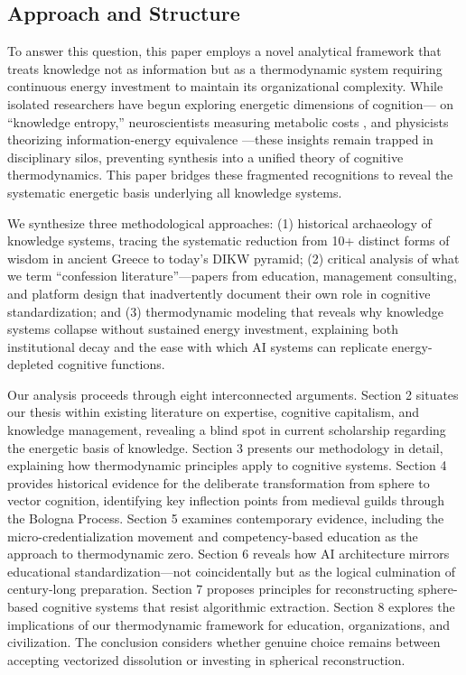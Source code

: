 \subsection{Approach and Structure}

To answer this question, this paper employs a novel analytical framework that treats knowledge not as information but as a thermodynamic system requiring continuous energy investment to maintain its organizational complexity. While isolated researchers have begun exploring energetic dimensions of cognition---\citet{bratianu2020} on ``knowledge entropy,'' neuroscientists measuring metabolic costs \citep{jamadar2025}, and physicists theorizing information-energy equivalence \citep{stonier1996}---these insights remain trapped in disciplinary silos, preventing synthesis into a unified theory of cognitive thermodynamics. This paper bridges these fragmented recognitions to reveal the systematic energetic basis underlying all knowledge systems.

We synthesize three methodological approaches: (1) historical archaeology of knowledge systems, tracing the systematic reduction from 10+ distinct forms of wisdom in ancient Greece to today's DIKW pyramid; (2) critical analysis of what we term ``confession literature''---papers from education, management consulting, and platform design that inadvertently document their own role in cognitive standardization; and (3) thermodynamic modeling that reveals why knowledge systems collapse without sustained energy investment, explaining both institutional decay and the ease with which AI systems can replicate energy-depleted cognitive functions.

Our analysis proceeds through eight interconnected arguments. Section 2 situates our thesis within existing literature on expertise, cognitive capitalism, and knowledge management, revealing a blind spot in current scholarship regarding the energetic basis of knowledge. Section 3 presents our methodology in detail, explaining how thermodynamic principles apply to cognitive systems. Section 4 provides historical evidence for the deliberate transformation from sphere to vector cognition, identifying key inflection points from medieval guilds through the Bologna Process. Section 5 examines contemporary evidence, including the micro-credentialization movement and competency-based education as the approach to thermodynamic zero. Section 6 reveals how AI architecture mirrors educational standardization---not coincidentally but as the logical culmination of century-long preparation. Section 7 proposes principles for reconstructing sphere-based cognitive systems that resist algorithmic extraction. Section 8 explores the implications of our thermodynamic framework for education, organizations, and civilization. The conclusion considers whether genuine choice remains between accepting vectorized dissolution or investing in spherical reconstruction.

